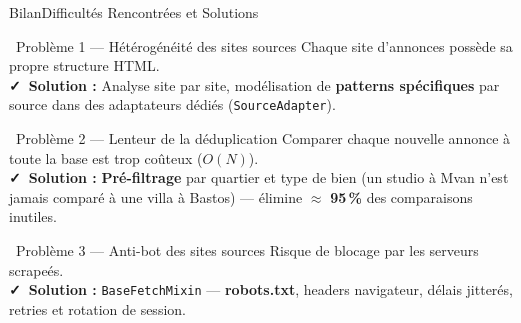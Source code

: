 \begin{frame}{Bilan}{Difficultés Rencontrées et Solutions}
  \begin{block}{\faExclamationTriangle\ Problème 1 — Hétérogénéité des sites sources}
    \small Chaque site d'annonces possède sa propre structure HTML.
    \\[2pt]
    \textbf{\faCheck\ Solution :} Analyse site par site, modélisation de \textbf{patterns spécifiques} par source dans des adaptateurs dédiés (\texttt{SourceAdapter}).
  \end{block}

  \vspace{0.3cm}
  \begin{block}{\faBalanceScale\ Problème 2 — Lenteur de la déduplication}
    \small Comparer chaque nouvelle annonce à toute la base est trop coûteux ($O(N)$).
    \\[2pt]
    \textbf{\faCheck\ Solution :} \textbf{Pré-filtrage} par quartier et type de bien (un studio à Mvan n'est jamais comparé à une villa à Bastos) — élimine $\approx$ \textbf{95\,\%} des comparaisons inutiles.
  \end{block}

  \vspace{0.3cm}
  \begin{block}{\faLock\ Problème 3 — Anti-bot des sites sources}
    \small Risque de blocage par les serveurs scrapeés.
    \\[2pt]
    \textbf{\faCheck\ Solution :} \texttt{BaseFetchMixin} — \textbf{robots.txt}, headers navigateur, délais jitterés, retries et rotation de session.
  \end{block}
\end{frame}